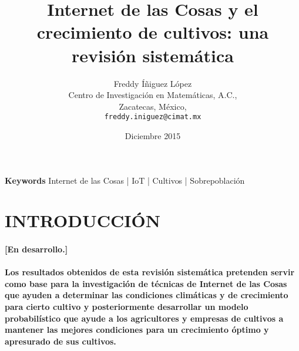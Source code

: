 \documentclass[10pt, twocolumn]{article}
\begin{document}
\title{\textbf{Internet de las Cosas y el crecimiento de cultivos: una revisión sistemática}}
\author{Freddy Íñiguez López\\
	Centro de Investigación en Matemáticas, A.C.,\\
	Zacatecas, México,\\
	\texttt{freddy.iniguez@cimat.mx}}
\date{Diciembre 2015}
\maketitle

\begin{abstract}
\end{abstract}
\paragraph{  }
\textbf{Keywords} Internet de las Cosas | IoT | Cultivos | Sobrepoblación

\section{INTRODUCCIÓN}
\paragraph{[En desarrollo.]}

\paragraph{Los resultados obtenidos de esta revisión sistemática pretenden servir como base para la investigación de técnicas de Internet de las Cosas que ayuden a determinar las condiciones climáticas y de crecimiento para cierto cultivo y posteriormente desarrollar un modelo probabilístico que ayude a los agricultores y empresas de cultivos a mantener las mejores condiciones para un crecimiento óptimo y apresurado de sus cultivos.}

\end{document}
